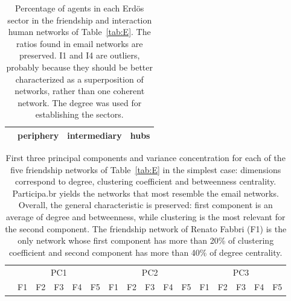 \documentclass[%
	aip,
	jmp,%
	amsmath,amssymb,
	reprint,%
	floatfix,
]{revtex4-1}
\begin{document}
							\begin{table}[!h]
								\caption{Percentage of agents in each Erd\"os sector in the friendship and interaction human networks of Table~\ref{tab:E}. The ratios found in email networks are preserved. I1 and I4 are outliers, probably because they should be better characterized as a superposition of networks, rather than one coherent network. The degree was used for establishing the sectors.}
								\begin{center}
									\begin{tabular}{| l | c | c | c |}\hline
										& periphery & intermediary & hubs \\ \hline\hline
										
										\hline
									\end{tabular}
								\end{center}
								\label{tab:secE}
							\end{table}


							\begin{table}[!h]
								\caption{First three principal components and variance concentration for each of the five friendship networks of Table~\ref{tab:E} in the simplest case: dimensions correspond to degree, clustering coefficient and betweenness centrality. Participa.br yields the networks that most resemble the email networks. Overall, the general characteristic is preserved: first component is an average of degree and betweenness, while clustering is the most relevant for the second component. The friendship network of Renato Fabbri (F1) is the only network whose first component has more than 20\% of clustering coefficient and second component has more than 40\% of degree centrality.}
									\footnotesize
									\begin{center}
										\begin{tabular}{| l ||  c |c |c |c |c || c | c | c | c | c || c |c |c |c |c |	}\cline{2-16}
											\multicolumn{1}{c|}{} & \multicolumn{5}{c||}{PC1}          & \multicolumn{5}{c||}{PC2} & \multicolumn{5}{c|}{PC3}  \\\cline{2-16}
											\multicolumn{1}{c|}{} & 
											F1 & F2 & F3 & F4 & F5 &	
											F1 & F2 & F3 & F4 & F5 &	
											F1 & F2 & F3 & F4 & F5 	\\\hline
											
											\hline
										\end{tabular}
									\end{center}
									\label{tab:pcaE1F}
								\end{table}
\end{document}
